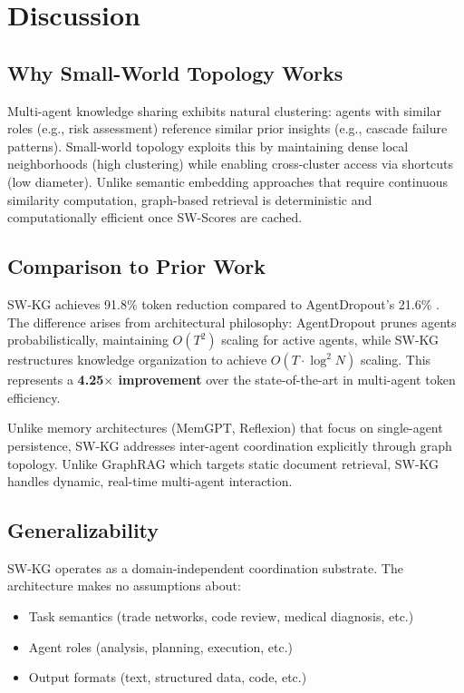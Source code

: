 \documentclass[11pt]{article}
\begin{document}
\section{Discussion}

\subsection{Why Small-World Topology Works}

Multi-agent knowledge sharing exhibits natural clustering: agents with similar roles (e.g., risk assessment) reference similar prior insights (e.g., cascade failure patterns). Small-world topology exploits this by maintaining dense local neighborhoods (high clustering) while enabling cross-cluster access via shortcuts (low diameter). Unlike semantic embedding approaches that require continuous similarity computation, graph-based retrieval is deterministic and computationally efficient once SW-Scores are cached.

\subsection{Comparison to Prior Work}

SW-KG achieves 91.8\% token reduction compared to AgentDropout's 21.6\% \cite{agentdropout}. The difference arises from architectural philosophy: AgentDropout prunes agents probabilistically, maintaining $O(T^2)$ scaling for active agents, while SW-KG restructures knowledge organization to achieve $O(T \cdot \log^2 N)$ scaling. This represents a \textbf{4.25$\times$ improvement} over the state-of-the-art in multi-agent token efficiency.

Unlike memory architectures (MemGPT, Reflexion) that focus on single-agent persistence, SW-KG addresses inter-agent coordination explicitly through graph topology. Unlike GraphRAG which targets static document retrieval, SW-KG handles dynamic, real-time multi-agent interaction.

\subsection{Generalizability}

SW-KG operates as a domain-independent coordination substrate. The architecture makes no assumptions about:
\begin{itemize}
    \item Task semantics (trade networks, code review, medical diagnosis, etc.)
    \item Agent roles (analysis, planning, execution, etc.)
    \item Output formats (text, structured data, code, etc.)
\end{itemize}
\end{document}
